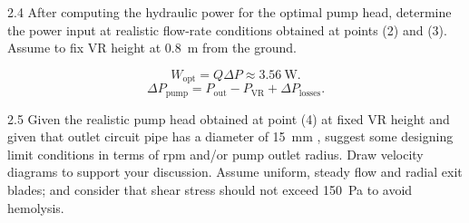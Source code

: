 
\begin{problem}{2.4}
  After computing the hydraulic power for the optimal pump head, determine the power input at realistic flow-rate conditions obtained at points (2) and (3). Assume to fix VR height at \qty{0,8}{\m} from the ground.
\end{problem}

\begin{derivation}
  \begin{equation*}
    W_{\text{opt}} = Q \Delta P \approx \qty{3,56}{\W} 
  .\end{equation*}
  \begin{equation*}
    \Delta P_{\text{pump}} = P_{\text{out}} - P_{\text{VR}} + \Delta P_{\text{losses}}
  .\end{equation*}
  
\end{derivation}

\begin{problem}{2.5}
  Given the realistic pump head obtained at point (4) at fixed VR height and given that outlet circuit pipe has a diameter of \qty{15}{\mm} , suggest some designing limit conditions in terms of rpm and/or pump outlet radius. Draw velocity diagrams to support your discussion. Assume uniform, steady flow and radial exit blades; and consider that shear stress should not exceed \qty{150}{\Pa} to avoid hemolysis.
\end{problem}


